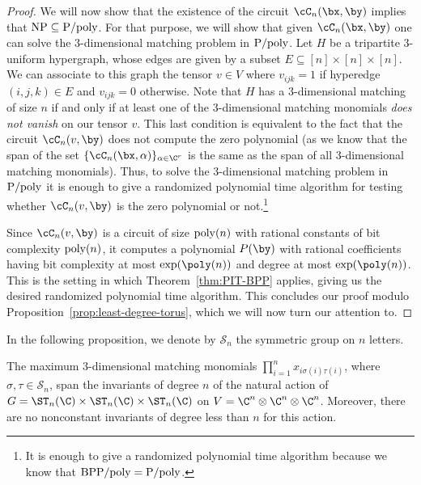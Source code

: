 \begin{proof}
	We will now show that the existence of the circuit $\cC_n(\bx, \by)$ implies that
	${\rm NP\subseteq P/poly}$. For that purpose, we will show that given $\cC_n(\bx, \by)$ one can
	solve the $3$-dimensional matching problem in ${\rm P/poly}$.
	Let $H$ be a tripartite 3-uniform hypergraph, whose edges are given by a subset
	$E \subseteq [n] \times [n] \times [n]$.
	We can associate to this graph the tensor $v \in V$ where
	$v_{ijk} = 1$ if hyperedge $(i,j,k) \in E$ and $v_{ijk} = 0$ otherwise.
	Note that $H$ has a $3$-dimensional matching of size $n$ if and only if at least one
	of the $3$-dimensional matching monomials \emph{does not vanish} on our tensor $v$.
	This last
	condition is equivalent to the fact that the circuit $\cC_n(v, \by)$ does not compute the
	zero polynomial (as we know that the span of the set $\{\cC_n(\bx, \alpha)\}_{\alpha \in \C^r}$
	is the same as the span of all $3$-dimensional matching monomials).
	Thus, to solve the $3$-dimensional
	matching problem in ${\rm P/poly}$ it is enough to give a randomized polynomial time algorithm
	for testing whether $\cC_n(v, \by)$ is the zero polynomial or not.\footnote{It is enough to
	give a randomized polynomial time algorithm because we know that ${\rm BPP/poly = P/poly}$.}

	Since $\cC_n(v, \by)$ is a circuit of size ${\rm poly}(n)$ with rational constants of bit
	complexity ${\rm poly}(n)$, it computes a polynomial $P(\by)$ with rational coefficients
	having bit complexity at most $\exp(\poly(n))$ and degree at most $\exp(\poly(n))$.
  This is the setting in which
	Theorem~\ref{thm:PIT-BPP} applies, giving us the desired randomized polynomial
	time algorithm. This concludes our proof modulo Proposition~\ref{prop:least-degree-torus},
	which we will now turn our attention to.
\end{proof}



%
%
%
%

%
%
%
%
%
%

%
%
%
%
%
%
%
%

\noindent
In the following proposition, we denote by $\mathcal{S}_n$ the symmetric group on $n$ letters.


\begin{proposition}\label{prop:least-degree-torus}
	The maximum $3$-dimensional matching monomials  $\prod_{i=1}^n x_{i \sigma(i) \tau(i)}$,
	where $\sigma, \tau \in \mathcal{S}_n$, span the invariants of degree
	$n$ of the natural action of $G = \ST_n(\C) \times \ST_n(\C) \times \ST_n(\C)$
	on $V = \C^n \otimes \C^n \otimes \C^n$. Moreover, there are no nonconstant invariants of degree less than $n$ for this action.
\end{proposition}

